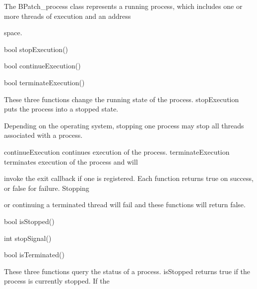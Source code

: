 \label{bkm:Ref160339852}\label{bkm:Ref160339594}{

The BPatch_process class represents a running process, which includes one or more threads of execution and an address

space.}





\bigskip



{

bool stopExecution()



{

bool continueExecution()



{

bool terminateExecution()}



{

These three functions change the running state of the process. stopExecution puts the process into a stopped state.

Depending on the operating system, stopping one process may stop all threads associated with a process.

continueExecution continues execution of the process. terminateExecution terminates execution of the process and will

invoke the exit callback if one is registered. Each function returns true on success, or false for failure. Stopping

or continuing a terminated thread will fail and these functions will return false.}



{

bool isStopped()



{

int stopSignal()



{

bool isTerminated()



{

These three functions query the status of a process. isStopped returns true if the process is currently stopped. If the

}}}}}}
